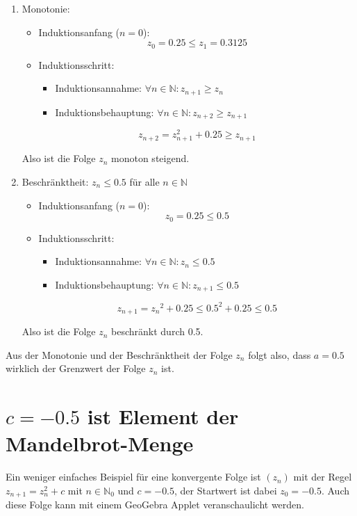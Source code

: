 \documentclass[a4paper, 12pt]{book}
\begin{document}
\begin{enumerate}
\item
  Monotonie:

\begin{itemize}
\item Induktionsanfang (\(n = 0\)):
\[z_{0} = 0.25 \leq z_{1} = 0.3125\]
\item Induktionsschritt:
\begin{itemize}
\item Induktionsannahme: \(\forall n \in \mathbb{N}:z_{n + 1} \geq z_{n}\)
\item Induktionsbehauptung:
\(\forall n \in \mathbb{N}:z_{n + 2} \geq z_{n + 1}\)
\end{itemize}
\[z_{n + 2} = z_{n + 1}^{2} + 0.25 \geq z_{n + 1}\]
\end{itemize}
Also ist die Folge \(z_{n}\) monoton steigend.

\item
  Beschränktheit: \(z_{n} \leq 0.5\) für alle \(n\mathbb{ \in N}\)
\begin{itemize}
\item Induktionsanfang (\(n = 0\)):
\[z_{0} = 0.25 \leq 0.5\]
\item Induktionsschritt:
\begin{itemize}
\item Induktionsannahme: \(\forall n \in \mathbb{N:}z_{n} \leq 0.5\)
\item Induktionsbehauptung:
\(\forall n \in \mathbb{N:}z_{n + 1} \leq 0.5\)
\end{itemize}
\[z_{n + 1} = {z_{n}}^{2} + 0.25 \leq {0.5}^{2} + 0.25 \leq 0.5\]
\end{itemize}
Also ist die Folge \(z_{n}\) beschränkt durch 0.5.
\end{enumerate}

Aus der Monotonie und der Beschränktheit der Folge \(z_{n}\) folgt also,
dass \(a = 0.5\) wirklich der Grenzwert der Folge \(z_{n}\) ist.
\hfill\blacksquare


\section{$c=-0.5$ ist Element der Mandelbrot-Menge}

Ein weniger einfaches Beispiel für eine konvergente Folge ist
\(\left( z_{n} \right)\) mit der Regel \(z_{n + 1} = z_{n}^{2} + c\) mit
\(n \in \mathbb{N}_{0}\) und \(c =  - 0.5\), der Startwert ist dabei
\(z_{0} =  - 0.5\). Auch diese Folge kann mit einem GeoGebra Applet
veranschaulicht werden.
\end{document}
